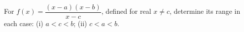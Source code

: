 For $f(x)=\dfrac{(x-a)(x-b)}{x-c}$, defined for real $x\ne c$, determine its range in each case: (i) $a<c<b$; (ii) $c<a<b$.
